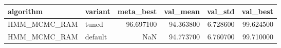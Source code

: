 \begin{tabular}{llrrrr}
\toprule
algorithm & variant & meta\_best & val\_mean & val\_std & val\_best \\
\midrule
HMM\_MCMC\_RAM & tuned & 96.697100 & 94.363800 & 6.728600 & 99.624500 \\
HMM\_MCMC\_RAM & default & NaN & 94.773700 & 6.760700 & 99.710000 \\
\bottomrule
\end{tabular}
